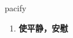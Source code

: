 
\begin{frame}
{\huge pacify}
\begin{center}
\begin{enumerate}\Large
  \item \textbf{使平静，安慰}
\end{enumerate}
\end{center}
\end{frame}
